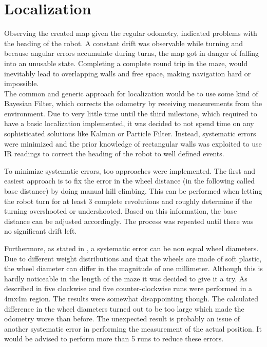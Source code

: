 \section{Localization}

Observing the created map given the regular odometry, indicated problems with the heading of the robot.
A constant drift was observable while turning and because angular errors accumulate during turns,
the map got in danger of falling into an unusable state.
Completing a complete round trip in the maze, would inevitably lead to overlapping walls and free space,
making navigation hard or impossible.\\

The common and generic approach for localization would be to use some kind of Bayesian Filter,
which corrects the odometry by receiving measurements from the environment.
Due to very little time until the third milestone, which required to have a basic localization implemented,
it was decided to not spend time on any sophisticated solutions like Kalman or Particle Filter.
Instead, systematic errors were minimized and the prior knowledge of rectangular walls was exploited to use IR readings to correct
the heading of the robot to well defined events.

To minimize systematic errors, too approaches were implemented.
The first and easiest approach is to fix the error in the wheel distance (in the following called base distance) by doing manual hill climbing.
This can be performed when letting the robot turn for at least 3 complete revolutions and roughly determine if the turning overshooted or undershooted.
Based on this information, the base distance can be adjusted accordingly.
The process was repeated until there was no significant drift left.

Furthermore, as stated in \cite{OdomCorr}, a systematic error can be non equal wheel diameters.
Due to different weight distributions and that the wheels are made of soft plastic, 
the wheel diameter can differ in the magnitude of one millimeter. 
Although this is hardly noticeable in the length of the maze it was decided to give it a try.
As described in \cite{OdomCorr} five clockwise and five counter-clockwise runs were performed in a 4mx4m region.
The results were somewhat disappointing though. 
The calculated difference in the wheel diameters turned out to be too large which made the odometry worse than before.
The unexpected result is probably an issue of another systematic error in performing the measurement of the actual position.
It would be advised to perform more than 5 runs to reduce these errors.

